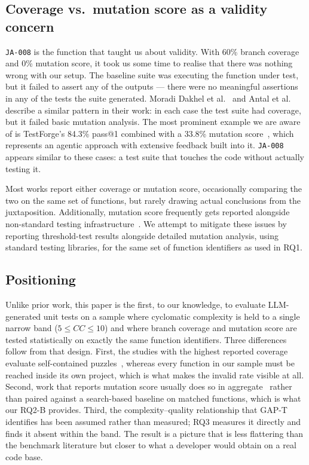 \subsection{Coverage vs.\ mutation score as a validity concern}\label{sec:rel-covmut}
\texttt{JA-008} is the function that taught us about validity. With 60\% branch coverage
and 0\% mutation score, it took us some time to realise that there was nothing wrong with
our setup. The baseline suite was executing the function under test, but it failed to
assert any of the outputs --- there were no meaningful assertions in any of the tests the
suite generated. Moradi Dakhel et al.~\cite{dakhela2023} and
Antal et al.~\cite{antal2025leveraging} describe a similar pattern in their work: in each
case the test suite had coverage, but it failed basic mutation analysis. The most
prominent example we are aware of is TestForge's 84.3\% pass@1 combined with a 33.8\%
mutation score~\cite{jain2025testgeneval}, which represents an agentic approach with
extensive feedback built into it. \texttt{JA-008} appears similar to these cases: a test
suite that touches the code without actually testing it.

Most works report either coverage or mutation score, occasionally comparing the two on
the same set of functions, but rarely drawing actual conclusions from the juxtaposition.
Additionally, mutation score frequently gets reported alongside non-standard testing
infrastructure~\cite{silva2025comparative}. We attempt to mitigate these issues by
reporting threshold-test results alongside detailed mutation analysis, using standard
testing libraries, for the same set of function identifiers as used in RQ1.

\subsection{Positioning}
Unlike prior work, this paper is the first, to our knowledge, to evaluate LLM-generated unit
tests on a sample where cyclomatic complexity is held to a single narrow band
($5 \le CC \le 10$) and where branch coverage and mutation score are tested statistically on
exactly the same function identifiers. Three differences follow from that design. First, the
studies with the highest reported coverage evaluate self-contained
puzzles~\cite{wang2025testeval,kumar2025empirical}, whereas every function in our sample must
be reached inside its own project, which is what makes the invalid rate visible at all.
Second, work that reports mutation score usually does so in
aggregate~\cite{sapozhnikov2024empirical,jain2025testgeneval} rather than paired against a
search-based baseline on matched functions, which is what our RQ2-B provides. Third, the
complexity--quality relationship that GAP-T identifies has been assumed rather than measured;
RQ3 measures it directly and finds it absent within the band. The result is a picture that is
less flattering than the benchmark literature but closer to what a developer would obtain on
a real code base.

